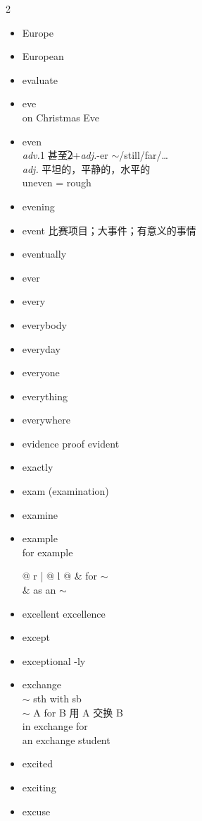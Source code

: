 \documentclass[../../book.tex]{subfiles}
\begin{document}
\begin{multicols}{2}
\begin{itemize}
\item[-] Europe
\item[-] European
\item[-] evaluate
\item[-] eve
\\on Christmas Eve
\item[-] even
\\\emph{adv.}\textcircled{1}甚至\textcircled{2}+\emph{adj.}-er $\sim$/still/far/\ldots
\\\emph{adj.} 平坦的，平静的，水平的
\\\phantom{adj.} uneven = rough
\item[-] evening
\item[-] event 比赛项目；大事件；有意义的事情
\item[-] eventually
\item[-] ever
\item[-] every
\item[-] everybody
\item[-] everyday
\item[-] everyone
\item[-] everything
\item[-] everywhere
\item[-] evidence \phantom{a} proof evident
\item[-] exactly
\item[-] exam (examination)
\item[-] examine
\item[-] example
\\for example
\\\begin{tabular}{@{} r | @{\hspace{0.1em}} l @{}}
 & for $\sim$
\\& as an $\sim$
\end{tabular}
\item[-] excellent \phantom{a} excellence
\item[-] except
\item[-] exceptional \phantom{a} -ly
\item[-] exchange
\\$\sim$ sth with sb
\\$\sim$ A for B 用 A 交换 B
\\in exchange for
\\an exchange student
\item[-] excited
\item[-] exciting
\item[-] excuse

\end{itemize}
\end{multicols}
\end{document}
